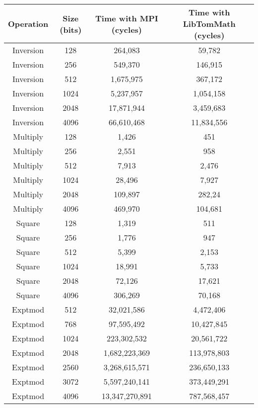 \documentclass{article}
\begin{document}
\begin{small}
\begin{center}
\begin{tabular}{c|c|c|c}
\hline \textbf{Operation} & \textbf{Size (bits)} & \textbf{Time with MPI (cycles)} & \textbf{Time with LibTomMath (cycles)} \\
\hline
Inversion & 128 & 264,083  & 59,782   \\
Inversion & 256 & 549,370  & 146,915   \\
Inversion & 512 & 1,675,975  & 367,172   \\
Inversion & 1024 & 5,237,957  & 1,054,158   \\
Inversion & 2048 & 17,871,944  & 3,459,683   \\
Inversion & 4096 & 66,610,468  & 11,834,556   \\
\hline
Multiply & 128 & 1,426   & 451     \\
Multiply & 256 & 2,551   & 958     \\
Multiply & 512 & 7,913   & 2,476     \\
Multiply & 1024 & 28,496   & 7,927   \\
Multiply & 2048 & 109,897   & 282,24     \\
Multiply & 4096 & 469,970   & 104,681     \\
\hline 
Square & 128 & 1,319   & 511     \\
Square & 256 & 1,776   & 947     \\
Square & 512 & 5,399  & 2,153    \\
Square & 1024 & 18,991  & 5,733     \\
Square & 2048 & 72,126  & 17,621    \\
Square & 4096 & 306,269  & 70,168  \\
\hline 
Exptmod & 512 & 32,021,586  & 4,472,406   \\
Exptmod & 768 & 97,595,492  & 10,427,845    \\
Exptmod & 1024 & 223,302,532  & 20,561,722    \\
Exptmod & 2048 & 1,682,223,369   & 113,978,803     \\
Exptmod & 2560 & 3,268,615,571   & 236,650,133      \\
Exptmod & 3072 & 5,597,240,141   & 373,449,291     \\
Exptmod & 4096 & 13,347,270,891   & 787,568,457     

\end{tabular}
\end{center}
\end{small}
\end{document}
